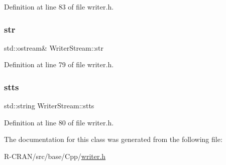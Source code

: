 Definition at line 83 of file writer.\+h.

\mbox{\label{classWriterStream_ac2546b4b790c718a1904e5e5163cabb6}} 
\subsubsection{\texorpdfstring{str}{str}}
{\footnotesize\ttfamily std\+::ostream\& Writer\+Stream\+::str\hspace{0.3cm}{\ttfamily [private]}}



Definition at line 79 of file writer.\+h.

\mbox{\label{classWriterStream_abc306418fe983c47cc843316f737df00}} 
\subsubsection{\texorpdfstring{stts}{stts}}
{\footnotesize\ttfamily std\+::string Writer\+Stream\+::stts\hspace{0.3cm}{\ttfamily [private]}}



Definition at line 80 of file writer.\+h.



The documentation for this class was generated from the following file\+:\begin{DoxyCompactItemize}
\item 
R-\/\+C\+R\+A\+N/src/base/\+Cpp/\hyperlink{writer_8h}{writer.\+h}\end{DoxyCompactItemize}
